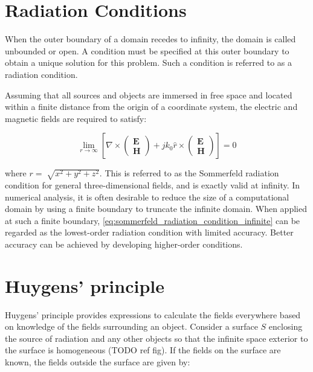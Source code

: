 \documentclass[a4paper,12pt]{report}
\begin{document}
\section{Radiation Conditions}

When the outer boundary of a domain recedes to infinity,
the domain is called unbounded or open.
A condition must be specified at this outer boundary to obtain a unique solution
for this problem.
Such a condition is referred to as a radiation condition.

Assuming that all sources and objects are immersed in free space
and located within a finite distance from the origin of a coordinate system,
the electric and magnetic fields are required to satisfy:

\begin{equation} \label{eq:sommerfeld_radiation_condition_infinite}
  \lim_{r \to \infty}\left[\nabla\times\begin{pmatrix}
    \boldsymbol{E} \\
    \boldsymbol{H}
  \end{pmatrix} + jk_0\hat{r} \times\begin{pmatrix}
    \boldsymbol{E} \\
    \boldsymbol{H}
  \end{pmatrix}\right] = 0
\end{equation}

where $r = \sqrt[]{x^2 + y^2 + z ^2}$.
This is referred to as the Sommerfeld radiation condition for general three-dimensional fields,
and is exactly valid at infinity.
In numerical analysis,
it is often desirable to reduce the size of a computational domain
by using a finite boundary to truncate the infinite domain.
When applied at such a finite boundary,
\ref{eq:sommerfeld_radiation_condition_infinite} can be regarded as the
lowest-order radiation condition with limited accuracy.
Better accuracy can be achieved by developing higher-order conditions.

\section{Huygens' principle}

Huygens' principle provides expressions to calculate the fields everywhere based
on knowledge of the fields surrounding an object.
Consider a surface $S$ enclosing the source of radiation and any other objects
so that the infinite space exterior to the surface is homogeneous (TODO ref fig).
If the fields on the surface are known, the fields outside the surface are given by:
\end{document}
